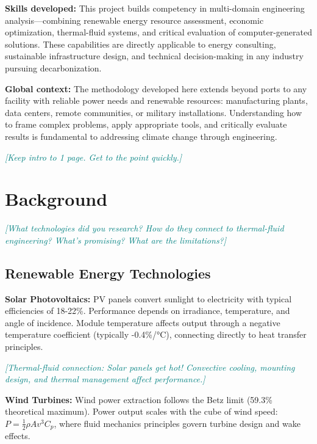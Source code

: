 \documentclass[11pt,letterpaper]{article}
\newcommand{\hint}[1]{\textcolor{teal}{\small\textit{[#1]}}}
\begin{document}
\textbf{Skills developed:} This project builds competency in multi-domain engineering analysis—combining renewable energy resource assessment, economic optimization, thermal-fluid systems, and critical evaluation of computer-generated solutions. These capabilities are directly applicable to energy consulting, sustainable infrastructure design, and technical decision-making in any industry pursuing decarbonization.

\textbf{Global context:} The methodology developed here extends beyond ports to any facility with reliable power needs and renewable resources: manufacturing plants, data centers, remote communities, or military installations. Understanding how to frame complex problems, apply appropriate tools, and critically evaluate results is fundamental to addressing climate change through engineering.

\hint{Keep intro to 1 page. Get to the point quickly.}

\section{Background}

\hint{What technologies did you research? How do they connect to thermal-fluid engineering? What's promising? What are the limitations?}

\subsection{Renewable Energy Technologies}

\textbf{Solar Photovoltaics:} PV panels convert sunlight to electricity with typical efficiencies of 18-22\%. Performance depends on irradiance, temperature, and angle of incidence. Module temperature affects output through a negative temperature coefficient (typically -0.4\%/°C), connecting directly to heat transfer principles.

\hint{Thermal-fluid connection: Solar panels get hot! Convective cooling, mounting design, and thermal management affect performance.}

\textbf{Wind Turbines:} Wind power extraction follows the Betz limit (59.3\% theoretical maximum). Power output scales with the cube of wind speed: $P = \frac{1}{2} \rho A v^3 C_p$, where fluid mechanics principles govern turbine design and wake effects.
\end{document}

